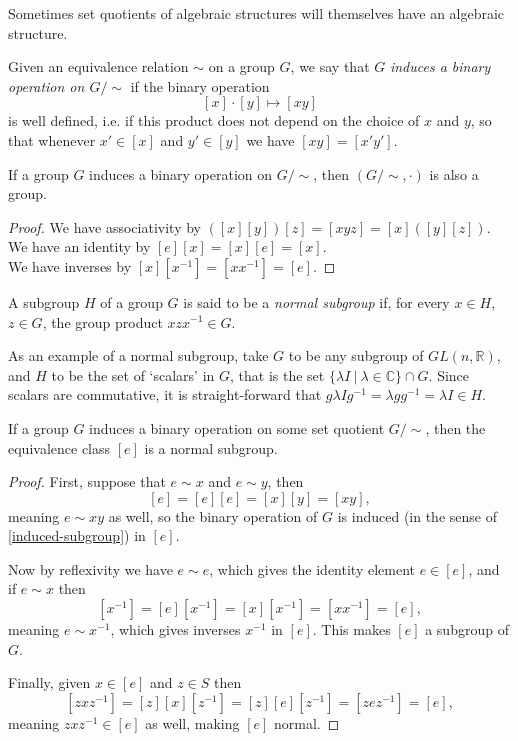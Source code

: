 Sometimes set quotients of algebraic structures will themselves have an algebraic structure.
\begin{define}
	Given an equivalence relation $\sim$ on a group $G$, we say that $G$ \emph{induces a binary operation on $G/\sim$} if the binary operation
	\[[x]\cdot[y] \mapsto [xy]\]
	is well defined, i.e. if this product does not depend on the choice of $x$ and $y$, so that whenever $x' \in [x]$ and $y' \in [y]$ we have $[xy] = [x'y']$.
\end{define}

\begin{prop}
	If a group $G$ induces a binary operation on $G/\sim$, then $(G/\sim, \cdot)$ is also a group.
\end{prop}
\begin{proof}
We have associativity by $([x][y])[z] = [xyz] = [x]([y][z])$.\\
We have an identity by $[e][x] = [x][e] = [x]$.\\
We have inverses by $[x][x^{-1}] = [xx^{-1}] = [e]$.
\end{proof}

\begin{define}\label{subgroup}
	A subgroup $H$ of a group $G$ is said to be a \emph{normal subgroup} if, for every $x \in H$, $z \in G$, the group product $xzx^{-1} \in G$.
\end{define}

As an example of a normal subgroup, take $G$ to be any subgroup of $GL(n, \mathbb{R})$, and $H$ to be the set of `scalars' in $G$, that is the set $\{\lambda I\ |\ \lambda \in \mathbb{C}\} \cap G$. Since scalars are commutative, it is straight-forward that $g\lambda I g^{-1} = \lambda gg^{-1} = \lambda I \in H$.

\begin{prop}
	If a group $G$ induces a binary operation on some set quotient $G/\sim$, then the equivalence class $[e]$ is a normal subgroup.
\end{prop}
\begin{proof}
	First, suppose that $e\sim x$ and $e\sim y$, then 
	\[[e] = [e][e] = [x][y] = [xy],\]
	meaning $e \sim xy$ as well, so the binary operation of $G$ is induced (in the sense of \autoref{induced-subgroup}) in $[e]$.
	
	Now by reflexivity we have $e \sim e$, which gives the identity element $e \in [e]$, and if $e \sim x$ then
	\[[x^{-1}] = [e][x^{-1}] = [x][x^{-1}] = [xx^{-1}] = [e],\]
	meaning $e \sim x^{-1}$, which gives inverses $x^{-1}$ in $[e]$. This makes $[e]$ a subgroup of $G$.
	
Finally, given $x \in [e]$ and $z \in S$ then
\[[zxz^{-1}] = [z][x][z^{-1}] = [z][e][z^{-1}] = [zez^{-1}] = [e],\]
meaning $zxz^{-1} \in [e]$ as well, making $[e]$ normal.
\end{proof}

